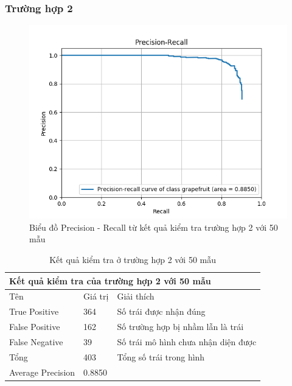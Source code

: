 \subsubsection{Trường hợp 2}
\begin{center}
    \begin{figure}[H]
    \centering
    \includegraphics[width=0.9\columnwidth]{images/chap3/50_curve_70k.png}
    \caption{Biểu đồ Precision - Recall từ kết quả kiểm tra trường hợp 2 với 50 mẫu}
    \label{fig:my_label}
    \end{figure}
\end{center}
\begin{table}[H]
    \begin{tabular}{p{4cm}  p{2.5cm}  p{5.5cm} }
    \multicolumn{3}{l}{Kết quả kiểm tra của trường hợp 2 với 50 mẫu} \\    
    \hline		
	Tên & Giá trị & Giải thích \\
	\hline
	True Positive & 364 & Số trái được nhận đúng \\
	False Positive & 162  & Số trường hợp bị nhầm lẫn là trái \\
	False Negative & 39 & Số trái mô hình chưa nhận diện được \\
    \hline
    Tổng & 403 & Tổng số trái trong hình \\
    \hline
	Average Precision & 0.8850\\
	\hline
	\end{tabular}
	\caption{Kết quả kiểm tra ở trường hợp 2 với 50 mẫu}
    \label{chap3:case2:table02}    
\end{table}
